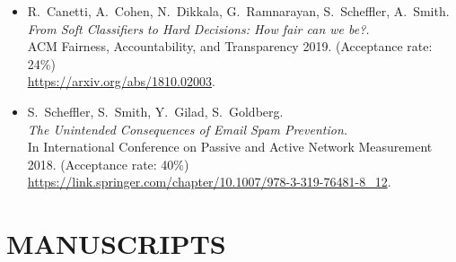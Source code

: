 \documentclass{res}
\begin{document}
\begin{resume}
\begin{itemize}
\item[\fairsibility] R.~Canetti, A.~Cohen, N.~Dikkala, G.~Ramnarayan, S.~Scheffler, A.~Smith. \\
\emph{From Soft Classifiers to Hard Decisions: How fair can we be?.} \\
ACM Fairness, Accountability, and Transparency 2019. (Acceptance rate: 24\%) \\
\url{https://arxiv.org/abs/1810.02003}.

\item[\emailspam] S.~Scheffler, S.~Smith, Y.~Gilad, S.~Goldberg. \\
\emph{The Unintended Consequences of Email Spam Prevention.} \\
In International Conference on Passive and Active Network Measurement 2018. (Acceptance rate: 40\%) \\
\url{https://link.springer.com/chapter/10.1007/978-3-319-76481-8\_12}.
\end{itemize}

%
%
%
%
%
%
%

%
%

\vspace{0.25in}

\section{MANUSCRIPTS}
\vspace{0.25in}


\end{resume}
\end{document}
